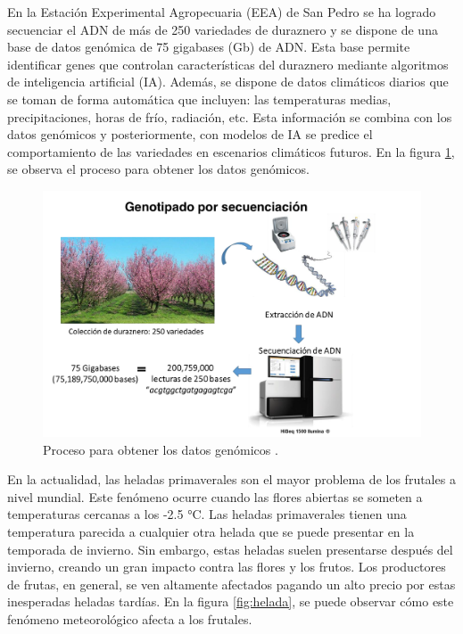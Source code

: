 En la  Estación Experimental Agropecuaria (EEA) de San Pedro se ha logrado secuenciar el ADN de más de 250 variedades de duraznero \cite{ARTICLE:1} y se dispone de una base de datos genómica de 75 gigabases (Gb) de ADN. Esta base permite identificar genes que controlan características del duraznero mediante algoritmos de inteligencia artificial (IA). Además, se dispone de datos climáticos diarios que se toman de forma automática que incluyen: las temperaturas medias, precipitaciones, horas de frío, radiación, etc. Esta información se combina con los datos genómicos y posteriormente, con modelos de IA se predice el comportamiento de las variedades en escenarios climáticos futuros. En la figura \ref{fig:genotipado}, se observa el proceso para obtener los datos genómicos.

\begin{figure}[ht]
	\centering
	\includegraphics[scale=.3]{./Figures/genotipado.png}
	\caption{Proceso para obtener los datos genómicos \cite{ARTICLE:1}.}
	\label{fig:genotipado}
\end{figure}

En la actualidad, las heladas primaverales son el mayor problema de los frutales a nivel mundial. Este fenómeno ocurre cuando las flores abiertas se someten a temperaturas cercanas a los -2.5 °C. Las heladas primaverales tienen una temperatura parecida a cualquier otra helada que se puede presentar en la temporada de invierno. Sin embargo, estas heladas suelen presentarse después del invierno, creando un gran impacto contra las flores y los frutos. Los productores de frutas, en general, se ven altamente afectados pagando un alto precio por estas inesperadas heladas tardías. En la figura \ref{fig:helada}, se puede observar cómo este fenómeno meteorológico afecta a los frutales.

